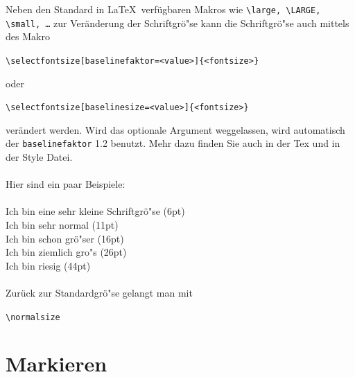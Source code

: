\documentclass[../thesis.tex]{subfiles}
\begin{document}
\noindent Neben den Standard in \LaTeX~verfügbaren Makros wie \texttt{\textbackslash large, \textbackslash LARGE, \textbackslash small, \ldots} zur Veränderung der Schriftgrö"se kann die Schriftgrö"se auch mittels des Makro

\begin{center}
\texttt{\textbackslash selectfontsize[baselinefaktor=<value>]\{<fontsize>\}}
\end{center}

\noindent oder

\begin{center}
\texttt{\textbackslash selectfontsize[baselinesize=<value>]\{<fontsize>\}}
\end{center}

\noindent verändert werden. Wird das optionale Argument weggelassen, wird automatisch der \texttt{baselinefaktor} 1.2 benutzt. Mehr dazu finden Sie auch in der Tex und in der Style Datei.\\
\\
Hier sind ein paar Beispiele:\\
\\
 Ich bin eine sehr kleine Schriftgrö"se (6pt)\\
 Ich bin sehr normal (11pt)\\
 Ich bin schon grö"ser (16pt)\\
 Ich bin ziemlich gro"s (26pt)\\
 Ich bin riesig (44pt)%
%
\normalsize\\
\\
Zurück zur Standardgrö"se gelangt man mit

\begin{center}
\texttt{\textbackslash normalsize}
\end{center}

\newpage



\section{Markieren}

\end{document}
